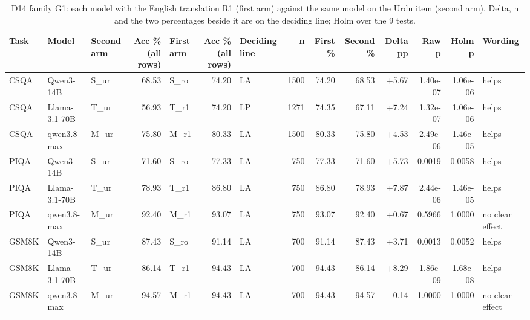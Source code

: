 \begin{table}[t]
\centering
\small
\caption{D14 family G1: each model with the English translation R1 (first arm) against the same model on the Urdu item (second arm). Delta, n and the two percentages beside it are on the deciding line; Holm over the 9 tests.}
\label{tab:d14-reading-effect}
\begin{tabular}{lllrlrlrrrrrrl}
\toprule
Task & Model & Second arm & Acc \% (all rows) & First arm & Acc \% (all rows) & Deciding line & n & First \% & Second \% & Delta pp & Raw p & Holm p & Wording \\
\midrule
CSQA & Qwen3-14B & S\_ur & 68.53 & S\_ro & 74.20 & LA & 1500 & 74.20 & 68.53 & +5.67 & 1.40e-07 & 1.06e-06 & helps \\
CSQA & Llama-3.1-70B & T\_ur & 56.93 & T\_r1 & 74.20 & LP & 1271 & 74.35 & 67.11 & +7.24 & 1.32e-07 & 1.06e-06 & helps \\
CSQA & qwen3.8-max & M\_ur & 75.80 & M\_r1 & 80.33 & LA & 1500 & 80.33 & 75.80 & +4.53 & 2.49e-06 & 1.46e-05 & helps \\
PIQA & Qwen3-14B & S\_ur & 71.60 & S\_ro & 77.33 & LA & 750 & 77.33 & 71.60 & +5.73 & 0.0019 & 0.0058 & helps \\
PIQA & Llama-3.1-70B & T\_ur & 78.93 & T\_r1 & 86.80 & LA & 750 & 86.80 & 78.93 & +7.87 & 2.44e-06 & 1.46e-05 & helps \\
PIQA & qwen3.8-max & M\_ur & 92.40 & M\_r1 & 93.07 & LA & 750 & 93.07 & 92.40 & +0.67 & 0.5966 & 1.0000 & no clear effect \\
GSM8K & Qwen3-14B & S\_ur & 87.43 & S\_ro & 91.14 & LA & 700 & 91.14 & 87.43 & +3.71 & 0.0013 & 0.0052 & helps \\
GSM8K & Llama-3.1-70B & T\_ur & 86.14 & T\_r1 & 94.43 & LA & 700 & 94.43 & 86.14 & +8.29 & 1.86e-09 & 1.68e-08 & helps \\
GSM8K & qwen3.8-max & M\_ur & 94.57 & M\_r1 & 94.43 & LA & 700 & 94.43 & 94.57 & -0.14 & 1.0000 & 1.0000 & no clear effect \\
\bottomrule
\end{tabular}
\end{table}
